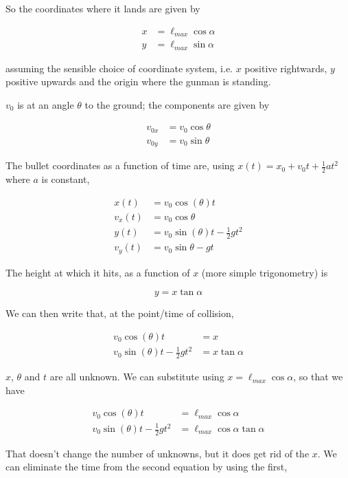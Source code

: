 \documentclass[8.01x]{subfiles}
\begin{document}
So the coordinates where it lands are given by

\begin{align}
x &= \ell_{max} \cos \alpha\\
y &= \ell_{max} \sin \alpha
\end{align}

assuming the sensible choice of coordinate system, i.e. $x$ positive rightwards, $y$ positive upwards and the origin where the gunman is standing.

$v_0$ is at an angle $\theta$ to the ground; the components are given by

\begin{align}
v_{0x} &= v_0 \cos \theta\\
v_{0y} &= v_0 \sin \theta
\end{align}

The bullet coordinates as a function of time are, using $x(t) = x_0 + v_0 t + \frac{1}{2} a t^2$ where $a$ is constant,

\begin{align}
x(t) &= v_0 \cos (\theta) t\\
v_x(t) &= v_0 \cos \theta\\
y(t) &= v_0 \sin (\theta) t - \frac{1}{2} g t^2\\
v_y(t) &= v_0 \sin \theta - g t
\end{align}

The height at which it hits, as a function of $x$ (more simple trigonometry) is

\begin{equation}
y = x \tan \alpha
\end{equation}

We can then write that, at the point/time of collision,

\begin{align}
v_0 \cos (\theta) t &= x\\
v_0 \sin (\theta) t - \frac{1}{2} g t^2 &= x \tan \alpha
\end{align}

$x$, $\theta$ and $t$ are all unknown. We can substitute using $x = \ell_{max} \cos \alpha$, so that we have

\begin{align}
v_0 \cos (\theta) t &= \ell_{max} \cos \alpha\\
v_0 \sin (\theta) t - \frac{1}{2} g t^2 &= \ell_{max} \cos \alpha \tan \alpha
\end{align}

That doesn't change the number of unknowns, but it does get rid of the $x$. We can eliminate the time from the second equation by using the first,
\end{document}

